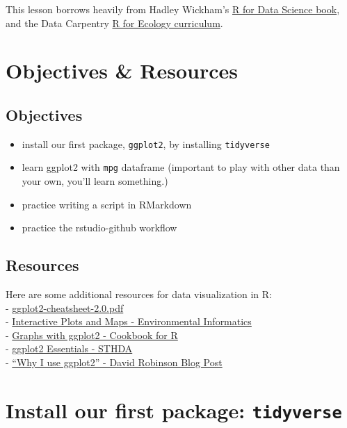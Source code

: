 \documentclass[]{book}
\providecommand{\tightlist}{%
  \setlength{\itemsep}{0pt}\setlength{\parskip}{0pt}}
\theoremstyle{definition}
\theoremstyle{definition}
\theoremstyle{definition}
\theoremstyle{remark}
\begin{document}
This lesson borrows heavily from Hadley Wickham's
\href{http://r4ds.had.co.nz/data-visualisation.html}{R for Data Science
book}, and the Data Carpentry
\href{http://www.datacarpentry.org/R-ecology-lesson/}{R for Ecology
curriculum}.

\section{Objectives \& Resources}\label{objectives-resources-1}

\subsection{Objectives}\label{objectives-1}

\begin{itemize}
\tightlist
\item
  install our first package, \texttt{ggplot2}, by installing
  \texttt{tidyverse}
\item
  learn ggplot2 with \texttt{mpg} dataframe (important to play with
  other data than your own, you'll learn something.)
\item
  practice writing a script in RMarkdown
\item
  practice the rstudio-github workflow
\end{itemize}

\subsection{Resources}\label{resources-1}

Here are some additional resources for data visualization in R:\\
-
\href{../cheatsheets/ggplot2-cheatsheet-2.0.pdf}{ggplot2-cheatsheet-2.0.pdf}\\
-
\href{http://ucsb-bren.github.io/env-info/wk06_widgets.html}{Interactive
Plots and Maps - Environmental Informatics}\\
- \href{http://www.cookbook-r.com/Graphs/\#graphs-with-ggplot2}{Graphs
with ggplot2 - Cookbook for R}\\
- \href{http://www.sthda.com/english/wiki/ggplot2-essentials}{ggplot2
Essentials - STHDA}\\
- \href{http://varianceexplained.org/r/why-I-use-ggplot2/}{``Why I use
ggplot2'' - David Robinson Blog Post}

\section{\texorpdfstring{Install our first package:
\texttt{tidyverse}}{Install our first package: tidyverse}}\label{install-our-first-package-tidyverse}
\end{document}
